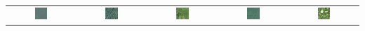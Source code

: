     \begin{table}
    \setlength{\tabcolsep}{0.2pt}
    \renewcommand{\arraystretch}{0.1}
        \begin{tabular}{ ccccc }
            
            
            \includegraphics[width=0.2\textwidth]{images/tipos/Au.png}& \includegraphics[width=0.2\textwidth]{images/tipos/Bu.png}& \includegraphics[width=0.2\textwidth]{images/tipos/Ru.png}& \includegraphics[width=0.2\textwidth]{images/tipos/Pu.png}& \includegraphics[width=0.2\textwidth]{images/tipos/Uu.png}\\

\end{tabular}
\end{table}
